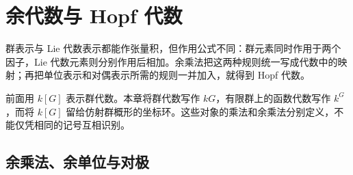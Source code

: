 
\section{余代数与 Hopf 代数}
\label{b5:sec:2101}


%
%

群表示与 Lie 代数表示都能作张量积，但作用公式不同：群元素同时作用于两个因子，Lie 代数元素则分别作用后相加。余乘法把这两种规则统一写成代数中的映射；再把单位表示和对偶表示所需的规则一并加入，就得到 Hopf 代数。

\ProseParagraphBreak

前面用 \(k[G]\) 表示群代数。本章将群代数写作 \(kG\)，有限群上的函数代数写作 \(k^G\)，而将 \(k[G]\) 留给仿射群概形的坐标环。这些对象的乘法和余乘法分别定义，不能仅凭相同的记号互相识别。

\subsection{余乘法、余单位与对极}
\label{b5:subsec:2101:01}

